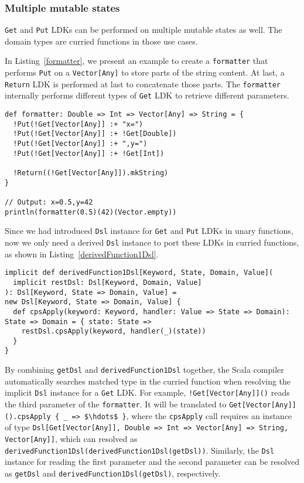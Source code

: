 \subsubsection{Multiple mutable states}\label{Multiple mutable states}

\lstinline{Get} and \lstinline{Put} LDKs can be performed on multiple mutable states as well. The domain types are curried functions in those use cases.

In Listing~\ref{formatter}, we present an example to create a \lstinline{formatter} that performs \lstinline{Put} on a \lstinline{Vector[Any]} to store parts of the string content. At last, a \lstinline{Return} LDK is performed at last to concatenate those parts. The \lstinline{formatter} internally performs different types of \lstinline{Get} LDK to retrieve different parameters.

\begin{lstlisting}[caption={Using \lstinline{Get} and \lstinline{Put} in a curried function},label={formatter}]
def formatter: Double => Int => Vector[Any] => String = {
  !Put(!Get[Vector[Any]] :+ "x=")
  !Put(!Get[Vector[Any]] :+ !Get[Double])
  !Put(!Get[Vector[Any]] :+ ",y=")
  !Put(!Get[Vector[Any]] :+ !Get[Int])

  !Return((!Get[Vector[Any]]).mkString)
}

// Output: x=0.5,y=42
println(formatter(0.5)(42)(Vector.empty))
\end{lstlisting}

Since we had introduced \lstinline{Dsl} instance for \lstinline{Get} and \lstinline{Put} LDKs in unary functions, now we only need a derived \lstinline{Dsl} instance to port these LDKs in curried functions, as shown in Listing~\ref{derivedFunction1Dsl}.

\begin{lstlisting}[caption={Derived \lstinline{Dsl} instance in a curried function},label={derivedFunction1Dsl}]
implicit def derivedFunction1Dsl[Keyword, State, Domain, Value](
  implicit restDsl: Dsl[Keyword, Domain, Value]
): Dsl[Keyword, State => Domain, Value] =
new Dsl[Keyword, State => Domain, Value] {
  def cpsApply(keyword: Keyword, handler: Value => State => Domain): State => Domain = { state: State =>
    restDsl.cpsApply(keyword, handler(_)(state))
  }
}
\end{lstlisting}

By combining \lstinline{getDsl} and \lstinline{derivedFunction1Dsl} together, the Scala compiler automatically searches matched type in the curried function when resolving the implicit \lstinline{Dsl} instance for a \lstinline{Get} LDK. For example, \lstinline{!Get[Vector[Any]]()} reads the third parameter of the \lstinline{formatter}. It will be translated to \lstinline[mathescape=true]|Get[Vector[Any]]().cpsApply { _ => $\hdots$ }|, where the \lstinline{cpsApply} call requires an instance of type \lstinline{Dsl[Get[Vector[Any]], Double => Int => Vector[Any] => String, Vector[Any]]}, which can resolved as \lstinline{derivedFunction1Dsl(derivedFunction1Dsl(getDsl))}. Similarly, the \lstinline{Dsl} instance for reading the first parameter and the second parameter can be resolved as \lstinline{getDsl} and \lstinline{derivedFunction1Dsl(getDsl)}, respectively.

